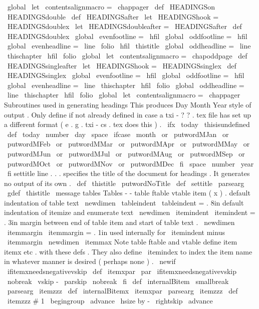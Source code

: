 {{{{{}
\
global
\
let
\
contentsalignmacro
=
\
chappager
}
\
def
\
HEADINGSon
{
\
HEADINGSdouble
}
\
def
\
HEADINGSafter
{
\
let
\
HEADINGShook
=
\
HEADINGSdoublex
}
\
let
\
HEADINGSdoubleafter
=
\
HEADINGSafter
\
def
\
HEADINGSdoublex
{
%
\
global
\
evenfootline
=
{
\
hfil
}
\
global
\
oddfootline
=
{
\
hfil
}
\
global
\
evenheadline
=
{
\
line
{
\
folio
\
hfil
\
thistitle
}
}
\
global
\
oddheadline
=
{
\
line
{
\
thischapter
\
hfil
\
folio
}
}
\
global
\
let
\
contentsalignmacro
=
\
chapoddpage
}
\
def
\
HEADINGSsingleafter
{
\
let
\
HEADINGShook
=
\
HEADINGSsinglex
}
\
def
\
HEADINGSsinglex
{
%
\
global
\
evenfootline
=
{
\
hfil
}
\
global
\
oddfootline
=
{
\
hfil
}
\
global
\
evenheadline
=
{
\
line
{
\
thischapter
\
hfil
\
folio
}
}
\
global
\
oddheadline
=
{
\
line
{
\
thischapter
\
hfil
\
folio
}
}
\
global
\
let
\
contentsalignmacro
=
\
chappager
}
%
Subroutines
used
in
generating
headings
%
This
produces
Day
Month
Year
style
of
output
.
%
Only
define
if
not
already
defined
in
case
a
txi
-
?
?
.
tex
file
has
set
%
up
a
different
format
(
e
.
g
.
txi
-
cs
.
tex
does
this
)
.
\
ifx
\
today
\
thisisundefined
\
def
\
today
{
%
\
number
\
day
\
space
\
ifcase
\
month
\
or
\
putwordMJan
\
or
\
putwordMFeb
\
or
\
putwordMMar
\
or
\
putwordMApr
\
or
\
putwordMMay
\
or
\
putwordMJun
\
or
\
putwordMJul
\
or
\
putwordMAug
\
or
\
putwordMSep
\
or
\
putwordMOct
\
or
\
putwordMNov
\
or
\
putwordMDec
\
fi
\
space
\
number
\
year
}
\
fi
%
settitle
line
.
.
.
specifies
the
title
of
the
document
for
headings
.
%
It
generates
no
output
of
its
own
.
\
def
\
thistitle
{
\
putwordNoTitle
}
\
def
\
settitle
{
\
parsearg
{
\
gdef
\
thistitle
}
}
\
message
{
tables
}
%
Tables
-
-
table
ftable
vtable
item
(
x
)
.
%
default
indentation
of
table
text
\
newdimen
\
tableindent
\
tableindent
=
.
8in
%
default
indentation
of
itemize
and
enumerate
text
\
newdimen
\
itemindent
\
itemindent
=
.
3in
%
margin
between
end
of
table
item
and
start
of
table
text
.
\
newdimen
\
itemmargin
\
itemmargin
=
.
1in
%
used
internally
for
\
itemindent
minus
\
itemmargin
\
newdimen
\
itemmax
%
Note
table
ftable
and
vtable
define
item
itemx
etc
.
with
%
these
defs
.
%
They
also
define
\
itemindex
%
to
index
the
item
name
in
whatever
manner
is
desired
(
perhaps
none
)
.
\
newif
\
ifitemxneedsnegativevskip
\
def
\
itemxpar
{
\
par
\
ifitemxneedsnegativevskip
\
nobreak
\
vskip
-
\
parskip
\
nobreak
\
fi
}
\
def
\
internalBitem
{
\
smallbreak
\
parsearg
\
itemzzz
}
\
def
\
internalBitemx
{
\
itemxpar
\
parsearg
\
itemzzz
}
\
def
\
itemzzz
#
1
{
\
begingroup
%
\
advance
\
hsize
by
-
\
rightskip
\
advance
\
}}}}

